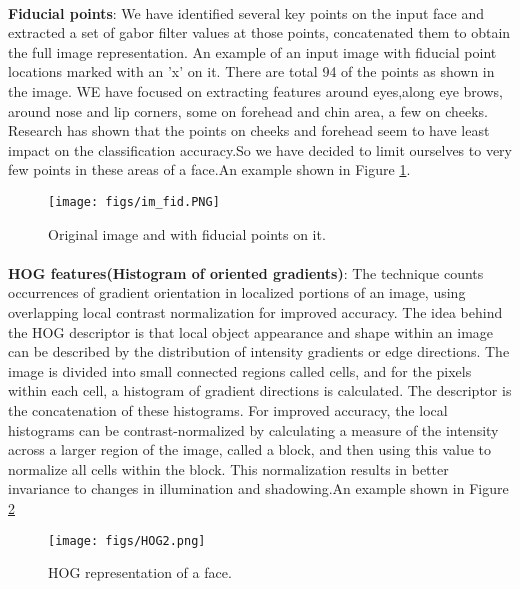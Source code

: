 \documentclass[10pt,twocolumn,letterpaper]{article}
\begin{document}
\paragraph{}
\textbf{Fiducial points}: We have identified several key points on the input face and extracted a set of gabor filter values at those points, concatenated them to obtain the full image representation.  An example of an input image with fiducial point locations marked with an 'x' on it. There are total 94 of the points as shown in the image. WE have focused on extracting features around eyes,along eye brows, around nose and lip corners, some on forehead and chin area, a few on cheeks. Research has shown that the points on cheeks and forehead seem to have least impact on the classification accuracy.So we have decided to limit ourselves to very few points in these areas of a face.An example shown in Figure \ref{fig:fid_image}.  

\begin{figure}[h]
\texttt{[image: figs/im\_fid.PNG]}
\caption{Original image and with fiducial points on it.}
\label{fig:fid_image}
\end{figure}

 \paragraph{}
\textbf{HOG features(Histogram of oriented gradients)}: The technique counts occurrences of gradient orientation in localized portions of an image, using overlapping local contrast normalization for improved accuracy. The idea behind the HOG descriptor is that local object appearance and shape within an image can be described by the distribution of intensity gradients or edge directions. The image is divided into small connected regions called cells, and for the pixels within each cell, a histogram of gradient directions is calculated. The descriptor is the concatenation of these histograms. For improved accuracy, the local histograms can be contrast-normalized by calculating a measure of the intensity across a larger region of the image, called a block, and then using this value to normalize all cells within the block. This normalization results in better invariance to changes in illumination and shadowing.An example shown in Figure \ref{fig:hog_image}

\begin{figure}[h]
\texttt{[image: figs/HOG2.png]}
\caption{HOG representation of a face.}
\label{fig:hog_image}
\end{figure}
\end{document}

